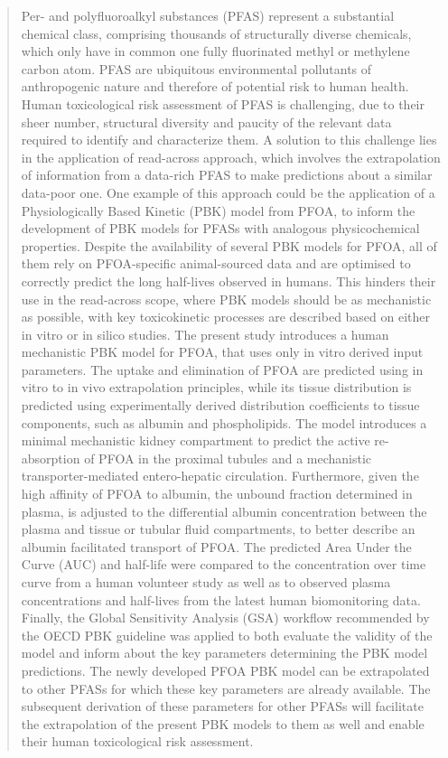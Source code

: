 \documentclass[
  authoryear,
  preprint]{elsarticle}
\begin{document}
\begin{frontmatter}
\begin{abstract}
Per- and polyfluoroalkyl substances (PFAS) represent a substantial
chemical class, comprising thousands of structurally diverse chemicals,
which only have in common one fully fluorinated methyl or methylene
carbon atom. PFAS are ubiquitous environmental pollutants of
anthropogenic nature and therefore of potential risk to human health.
Human toxicological risk assessment of PFAS is challenging, due to their
sheer number, structural diversity and paucity of the relevant data
required to identify and characterize them. A solution to this challenge
lies in the application of read-across approach, which involves the
extrapolation of information from a data-rich PFAS to make predictions
about a similar data-poor one. One example of this approach could be the
application of a Physiologically Based Kinetic (PBK) model from PFOA, to
inform the development of PBK models for PFASs with analogous
physicochemical properties. Despite the availability of several PBK
models for PFOA, all of them rely on PFOA-specific animal-sourced data
and are optimised to correctly predict the long half-lives observed in
humans. This hinders their use in the read-across scope, where PBK
models should be as mechanistic as possible, with key toxicokinetic
processes are described based on either in vitro or in silico studies.
The present study introduces a human mechanistic PBK model for PFOA,
that uses only in vitro derived input parameters. The uptake and
elimination of PFOA are predicted using in vitro to in vivo
extrapolation principles, while its tissue distribution is predicted
using experimentally derived distribution coefficients to tissue
components, such as albumin and phospholipids. The model introduces a
minimal mechanistic kidney compartment to predict the active
re-absorption of PFOA in the proximal tubules and a mechanistic
transporter-mediated entero-hepatic circulation. Furthermore, given the
high affinity of PFOA to albumin, the unbound fraction determined in
plasma, is adjusted to the differential albumin concentration between
the plasma and tissue or tubular fluid compartments, to better describe
an albumin facilitated transport of PFOA. The predicted Area Under the
Curve (AUC) and half-life were compared to the concentration over time
curve from a human volunteer study as well as to observed plasma
concentrations and half-lives from the latest human biomonitoring data.
Finally, the Global Sensitivity Analysis (GSA) workflow recommended by
the OECD PBK guideline was applied to both evaluate the validity of the
model and inform about the key parameters determining the PBK model
predictions. The newly developed PFOA PBK model can be extrapolated to
other PFASs for which these key parameters are already available. The
subsequent derivation of these parameters for other PFASs will
facilitate the extrapolation of the present PBK models to them as well
and enable their human toxicological risk assessment.
\end{abstract}






\end{frontmatter}
\end{document}

